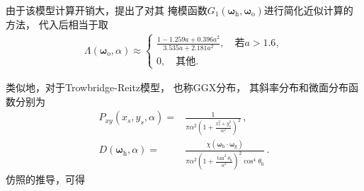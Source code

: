 由于该模型计算开销大，\citet{10.5555/2383847.2383874}提出了对其
掩模函数$G_1({\bm\omega}_{\mathrm{h}},{\bm\omega}_{\mathrm{o}})$进行简化近似计算的方法，
代入后相当于取
\begin{align}\label{eq:08-ex01-approximation-Beckmann}
    \Lambda({\bm\omega}_{\mathrm{o}},\alpha)\approx\left\{\begin{array}{l}
        \displaystyle\frac{1-1.259a+0.396a^2}{3.535a+2.181a^2},\quad\text{若}a>1.6, \\
        0,\quad\text{其他}.
    \end{array}\right.
\end{align}

类似地，对于Trowbridge-Reitz模型\citep{Trowbridge:75}，
也称GGX分布\citep{10.5555/2383847.2383874}，
其斜率分布和微面分布函数分别为
\begin{align}
    P_{xy}(x_s,y_s,\alpha)=&\frac{1}{\displaystyle\pi\alpha^2\left(1+\frac{x_s^2+y_s^2}{\alpha^2}\right)^2}\, ,\\
    D({\bm\omega}_{\mathrm{h}},\alpha)=&\frac{\chi({\bm\omega}_{\mathrm{h}}\cdot{\bm\omega}_{\mathrm{g}})}
    {\displaystyle\pi\alpha^2\left(1+\frac{\tan^2\theta_{\mathrm{h}}}{\alpha^2}\right)^2\cos^4\theta_{\mathrm{h}}}\, .
\end{align}
仿照的推导，可得

